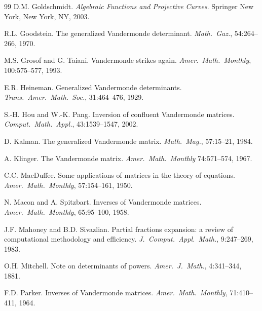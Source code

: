 \documentclass{article}
\theoremstyle{definition}
\begin{document}
\begin{thebibliography}{99}
D.M. Goldschmidt.
\newblock \emph{Algebraic Functions and Projective Curves}.
\newblock Springer New York, New York, NY, 2003. 

R.L. Goodstein. 
\newblock The generalized Vandermonde determinant.
\newblock \emph{Math.\ Gaz.}, 54:264--266, 1970. 

M.S. Grosof and G. Taiani.
\newblock Vandermonde strikes again.
\newblock \emph{Amer.\ Math.\ Monthly}, 100:575--577, 1993.

E.R. Heineman. 
\newblock Generalized Vandermonde determinants.
\newblock \emph{Trans.\ Amer.\ Math.\ Soc.}, 31:464--476, 1929. 

S.-H. Hou and W.-K. Pang.
\newblock Inversion of confluent Vandermonde matrices.
\newblock \emph{Comput.\ Math.\ Appl.}, 43:1539--1547, 2002.

D. Kalman. 
\newblock The generalized Vandermonde matrix.
\newblock \emph{Math.\ Mag.}, 57:15--21, 1984. 

A. Klinger.
\newblock The Vandermonde matrix.
\newblock \emph{Amer.\ Math.\ Monthly} 74:571--574, 1967. 

C.C. MacDuffee. 
\newblock Some applications of matrices in the theory of equations. 
\newblock \emph{Amer.\ Math.\ Monthly}, 57:154--161, 1950. 

N. Macon and A. Spitzbart. 
\newblock Inverses of Vandermonde matrices. 
\newblock \emph{Amer.\ Math.\ Monthly}, 65:95--100, 1958. 

J.F. Mahoney and B.D. Sivazlian.
\newblock Partial fractions expansion: a review of computational methodology and efficiency.
\newblock \emph{J.\ Comput.\ Appl.\ Math.}, 9:247--269, 1983. 

O.H. Mitchell. 
\newblock Note on determinants of powers.
\newblock \emph{Amer.\ J.\ Math.}, 4:341--344, 1881. 

F.D. Parker. 
\newblock Inverses of Vandermonde matrices.
\newblock \emph{Amer.\ Math.\ Monthly}, 71:410--411, 1964. 


\end{thebibliography}
\end{document}
